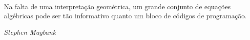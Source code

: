 \quad\\
\vspace{21 cm}

\noindent Na falta de uma interpretação geométrica, um grande conjunto de equações algébricas pode ser tão informativo quanto um bloco de códigos de programação.

\begin{flushright}
{\it Stephen Maybank}
\end{flushright}

\newpage